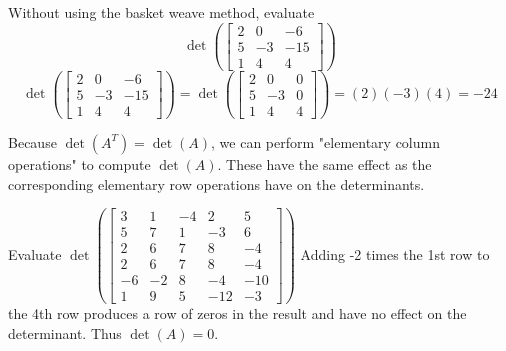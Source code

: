 \documentclass[12pt]{article}
\begin{document}
  \begin{example} Without using the basket weave method, evaluate $$\det(\begin{bmatrix} 2 & 0 & -6 \\ 5 & -3 & -15 \\ 1 & 4 & 4 \end{bmatrix})$$ $$ \det(\begin{bmatrix} 2 & 0 & -6 \\ 5 & -3 & -15 \\ 1 & 4 & 4 \end{bmatrix}) = \det(\begin{bmatrix} 2 & 0 & 0 \\ 5 & -3 & 0 \\ 1 & 4 & 4 \end{bmatrix}) = (2)(-3)(4) = -24 $$ \end{example} 
  Because $\det(A^T) = \det(A)$, we can perform "elementary column operations" to compute $\det(A)$. These have the same effect as the corresponding elementary row operations have on the determinants. 
 \begin{example} Evaluate $\det(\begin{bmatrix} 3 & 1 & -4 & 2 & 5 \\ 5 & 7 & 1 & -3 & 6 \\ 2 & 6 & 7 & 8 & -4 \\ 2 & 6 & 7 & 8 & -4 \\ -6 & -2 & 8 & -4 & -10 \\ 1 & 9 & 5 & -12 & -3 \end{bmatrix}) $ \newline Adding -2 times the 1st row to the 4th row produces a row of zeros in the result and have no effect on the determinant. Thus $\det(A) = 0$. \end{example} 
 
\end{document}
